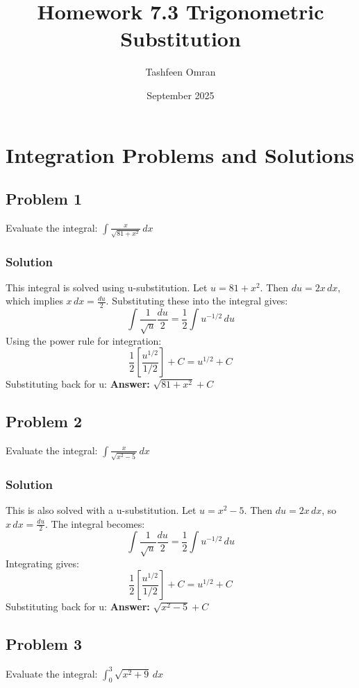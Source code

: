 \documentclass{article}
\title{Homework 7.3 Trigonometric Substitution}
\author{Tashfeen Omran}
\date{September 2025}
\begin{document}
\maketitle

\section{Integration Problems and Solutions}

\subsection{Problem 1}
Evaluate the integral: $ \int \frac{x}{\sqrt{81 + x^2}} \,dx $
\subsubsection*{Solution}
This integral is solved using u-substitution.
Let $ u = 81 + x^2 $.
Then $ du = 2x \,dx $, which implies $ x \,dx = \frac{du}{2} $.
Substituting these into the integral gives:
\[ \int \frac{1}{\sqrt{u}} \frac{du}{2} = \frac{1}{2} \int u^{-1/2} \,du \]
Using the power rule for integration:
\[ \frac{1}{2} \left[ \frac{u^{1/2}}{1/2} \right] + C = u^{1/2} + C \]
Substituting back for u:
\textbf{Answer:} $ \sqrt{81 + x^2} + C $


\subsection{Problem 2}
Evaluate the integral: $ \int \frac{x}{\sqrt{x^2 - 5}} \,dx $
\subsubsection*{Solution}
This is also solved with a u-substitution.
Let $ u = x^2 - 5 $.
Then $ du = 2x \,dx $, so $ x \,dx = \frac{du}{2} $.
The integral becomes:
\[ \int \frac{1}{\sqrt{u}} \frac{du}{2} = \frac{1}{2} \int u^{-1/2} \,du \]
Integrating gives:
\[ \frac{1}{2} \left[ \frac{u^{1/2}}{1/2} \right] + C = u^{1/2} + C \]
Substituting back for u:
\textbf{Answer:} $ \sqrt{x^2 - 5} + C $


\subsection{Problem 3}
Evaluate the integral: $ \int_{0}^{3} \sqrt{x^2 + 9} \,dx $
\end{document}
